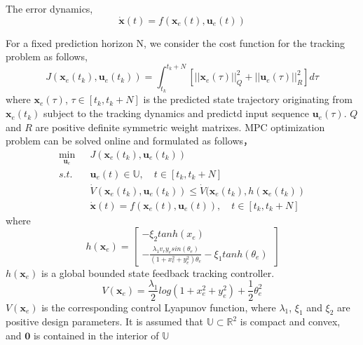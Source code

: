 \documentclass[journal,11pt,draftcls,onecolumn]{IEEEtran}
\begin{document}
The error dynamics,
\begin{equation}
\dot{\textbf{x}}(t)=f(\textbf{x}_e(t),\textbf{u}_e(t))
\end{equation}

For a fixed prediction horizon N, we consider the cost function for the tracking problem as follows,
\begin{equation}
J(\textbf{x}_e(t_k),\textbf{u}_e(t_k))=\int_{t_k}^{t_k+N}[||\textbf{x}_e(\tau)||_Q^2+||\textbf{u}_e(\tau)||_R^2]d\tau
\end{equation}
where $\textbf{x}_e(\tau)$, $\tau\in [t_k,t_k+N]$ is the predicted state trajectory originating from $\textbf{x}_e(t_k)$ subject to the tracking dynamics and predictd input sequence $\textbf{u}_e(\tau)$. $Q$ and $R$ are positive definite symmetric weight matrixes. MPC optimization problem can be solved online and formulated as follows，
\begin{equation}
\begin{split}
\min\limits_{\textbf{u}_e}&J(\textbf{x}_e(t_k),\textbf{u}_e(t_k))\\
s.t.\quad %
 &\textbf{u}_e(t)\in\mathbb{U},\quad t\in[t_k,t_k+N]\\
&\dot{V}(\textbf{x}_e(t_k),\textbf{u}_e(t_k))\leq \dot{V}(\textbf{x}_e(t_k),h(\textbf{x}_e(t_k))\\
&\dot{\textbf{x}}(t)=f(\textbf{x}_e(t),\textbf{u}_e(t)), \quad t\in[t_k,t_k+N]
\end{split}
\end{equation}
where
\begin{equation}
h(\textbf{x}_e)=
\begin{bmatrix}-\xi_2tanh(x_e)\\ 
-\frac{\lambda_1 v_ry_esin(\theta_e)}{(1+x_e^2+y_e^2)\theta_e}-\xi_1 tanh(\theta_e)
\end{bmatrix}
\end{equation}
$h(\textbf{x}_e)$ is a global bounded state feedback tracking controller.
\begin{equation}
V(\textbf{x}_e)=\frac{\lambda_1}{2}log(1+x_e^2+y_e^2)+\frac{1}{2}\theta_e^2
\end{equation}
$V(\textbf{x}_e)$ is the corresponding control Lyapunov function, where $\lambda_1$, $\xi_1$ and $\xi_2$ are positive design parameters. It is assumed that $\mathbb{U}\subset \mathbb{R}^2$ is compact and convex, and $\textbf{0}$ is contained in the interior of $\mathbb{U}$
\end{document}
